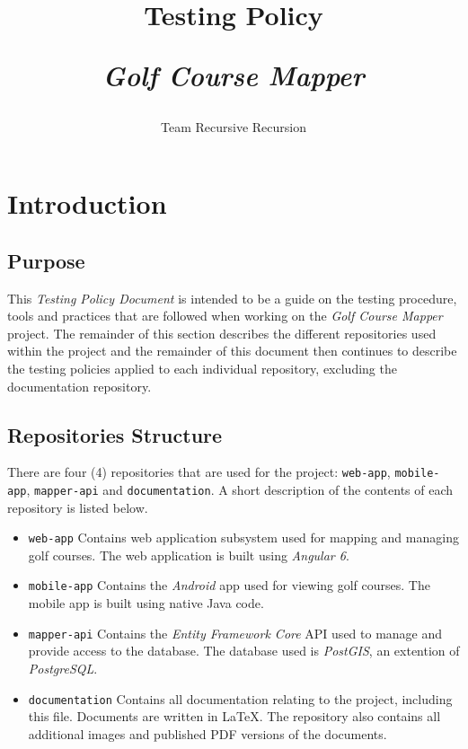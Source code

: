 \documentclass{article}
\title{
    Testing Policy\\
    \begin{large}
        \textit{Golf Course Mapper}
    \end{large}
}
\date{
    \begin{small}
        \today
    \end{small}
}
\author{
    Team Recursive Recursion
}
\begin{document}
    \maketitle
    \newpage
    
    \tableofcontents
    \newpage


    \section{Introduction}
    \label{sec:intro}

    \subsection{Purpose}
    \label{sec:purp}

    This \textit{Testing Policy Document} is intended to be a guide on the
    testing procedure, tools and practices that are followed when working on the
    \textit{Golf Course Mapper} project. The remainder of this section describes
    the different repositories used within the project and the remainder of this
    document then continues to describe the testing policies applied to each
    individual repository, excluding the documentation repository.

    \subsection{Repositories Structure}
    \label{sec:reps}

    There are four (4) repositories that are used for the project:
    \texttt{web-app}, \texttt{mobile-app}, \texttt{mapper-api} and
    \texttt{documentation}. A short description of the contents of each
    repository is listed below.

    \begin{itemize}
        \item \texttt{web-app}
            \subitem Contains web application subsystem used for mapping and
            managing golf courses. The web application is built using
            \textit{Angular 6}.
        \item \texttt{mobile-app}
            \subitem Contains the \textit{Android} app used for viewing golf
            courses. The mobile app is built using native Java code.
        \item \texttt{mapper-api}
            \subitem Contains the \textit{Entity Framework Core} API used to
            manage and provide access to the database. The database used is
            \textit{PostGIS}, an extention of \textit{PostgreSQL}.
        \item \texttt{documentation}
            \subitem Contains all documentation relating to the project,
            including this file. Documents are written in \LaTeX. The repository
            also contains all additional images and published PDF versions of
            the documents.
    \end{itemize}
\end{document}
